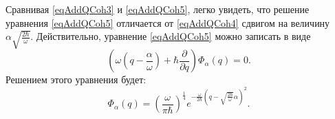 Сравнивая \eqref{eqAddQCoh3} и \eqref{eqAddQCoh5}, легко увидеть, что
решение уравнения \eqref{eqAddQCoh5} отличается от \eqref{eqAddQCoh4}
сдвигом на величину
$\alpha\sqrt{\frac{2\hbar}{\omega}}$. Действительно, уравнение
\eqref{eqAddQCoh5} можно записать в виде
\begin{equation}
\left(
\omega \left(q - \frac{\alpha}{\omega}\right) + \hbar \frac{\partial}{\partial q}
\right) \Phi_{\alpha}\left(q\right) = 0.
\nonumber
\end{equation}
Решением этого уравнения будет:
\begin{equation}
\Phi_{\alpha}\left(q\right) = \left(\frac{\omega}{\pi
  \hbar}\right)^{\frac{1}{4}} e^{-\frac{\omega}{2
    \hbar}\left(q-\sqrt{\frac{2\hbar}{\omega}}\alpha\right)^2}. 
\label{eqAddQCoh7}
\end{equation}

